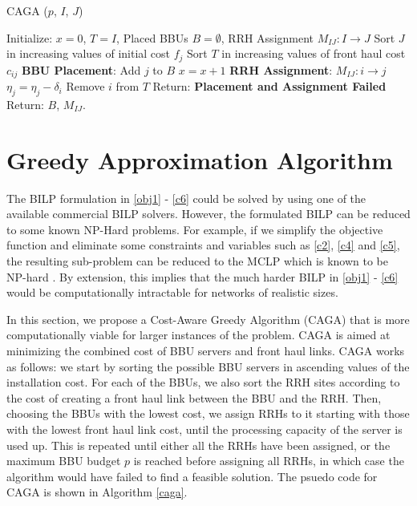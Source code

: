 \documentclass[conference]{IEEEtran}
\begin{document}
\begin{algorithm}[t]
\caption{CAGA \Big($p$, $I$, $J$\Big)}
\label{caga}
\renewcommand{\arraystretch}{3.5}
\begin{algorithmic}[1]
\STATE Initialize: $x = 0$, $T = I$, Placed \acp{BBU} $B = \emptyset$, \ac{RRH} Assignment $M_{IJ}: I \longrightarrow J$
\STATE Sort $J$ in increasing values of initial cost $f_j$
\STATE Sort $T$ in increasing values of front haul cost $c_{ij}$
\STATE  \textbf{BBU Placement}: Add $j$ to $B$
\STATE $x = x + 1$
\ENDIF
\STATE \textbf{RRH Assignment}: $M_{IJ}: i \longrightarrow j$
\STATE $\eta_j = \eta_j - \delta_i$
\STATE Remove $i$ from $T$
\ENDIF
\ENDFOR
\ENDIF
\ENDFOR
{}
\STATE Return: \textbf{Placement and Assignment Failed}
\ELSE
\STATE Return: $B$, $M_{IJ}$.
\ENDIF
\end{algorithmic}
\end{algorithm}

\section{Greedy Approximation Algorithm}\label{greedy}

The \ac{BILP} formulation in \eqref{obj1} - \eqref{c6} could be solved by using one of the available commercial BILP solvers. However, the formulated BILP can be reduced to some known NP-Hard problems. For example, if we simplify the objective function and eliminate some constraints and variables such as \eqref{c2}, \eqref{c4} and \eqref{c5}, the resulting sub-problem can be reduced to the \ac{MCLP} which is known to be NP-hard \cite{MCLP74}. By extension, this implies that the much harder \ac{BILP} in \eqref{obj1} - \eqref{c6} would be computationally intractable for networks of realistic sizes.

In this section, we propose a Cost-Aware Greedy Algorithm (CAGA) that is more computationally viable for larger instances of the problem. CAGA is aimed at minimizing the combined cost of BBU servers and front haul links. CAGA works as follows: we start by sorting the possible BBU servers in ascending values of the installation cost. For each of the BBUs, we also sort the RRH sites according to the cost of creating a front haul link between the BBU and the RRH. Then, choosing the BBUs with the lowest cost, we assign RRHs to it starting with those with the lowest front haul link cost, until the processing capacity of the server is used up. This is repeated until either all the RRHs have been assigned, or the maximum BBU budget $p$ is reached before assigning all RRHs, in which case the algorithm would have failed to find a feasible solution. The psuedo code for CAGA is shown in Algorithm \ref{caga}.\\
\end{document}
